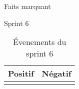\documentclass[]{article}
\begin{document}
{\begin{section}{Faits marquant}
    \begin{subsection}{Sprint 6}
        \begin{table}[H]
            \caption{Évenements du sprint 6}
            \begin{tabularx}{\columnwidth}{|X|X|}
                \hline
                \cellcolor[HTML]{17FF00}Positif & \cellcolor[HTML]{FF2D00}Négatif\\
                \hline
                 & \\
                \hline
            \end{tabularx}
        \end{table}
    \end{subsection}
\end{section}
}
\end{document}
